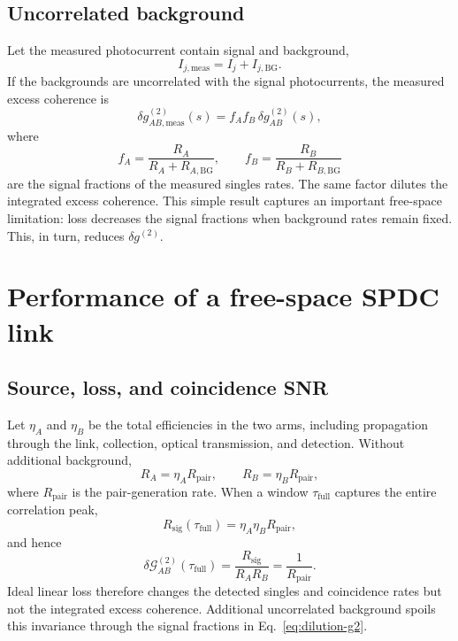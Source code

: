 \documentclass[a4paper,10pt]{article}
\begin{document}
\subsection{Uncorrelated background}

Let the measured photocurrent contain signal and background,
\begin{equation}
    I_{j,\mathrm{meas}}=I_j+I_{j,\mathrm{BG}}.
\end{equation}
If the backgrounds are uncorrelated with the signal photocurrents, the measured excess coherence is
\begin{equation}
    \label{eq:dilution-g2}
    \delta g^{(2)}_{AB,\mathrm{meas}}(s)
    =f_A f_B\,\delta g^{(2)}_{AB}(s),
\end{equation}
where
\begin{equation}
    f_A=\frac{R_A}{R_A+R_{A,\mathrm{BG}}},
    \qquad
    f_B=\frac{R_B}{R_B+R_{B,\mathrm{BG}}}
\end{equation}
are the signal fractions of the measured singles rates.  The same factor dilutes the integrated excess coherence.  This simple result captures an important free-space limitation: loss decreases the signal fractions when background rates remain fixed. This, in turn, reduces $\delta g^{(2)}$.

\section{Performance of a free-space SPDC link}
\label{sec:spdc}

\subsection{Source, loss, and coincidence SNR}

Let $\eta_A$ and $\eta_B$ be the total efficiencies in the two arms, including propagation through the link, collection, optical transmission, and detection.  Without additional background,
\begin{equation}
    \label{eq:spdc-singles-rates}
    R_A=\eta_A R_{\mathrm{pair}},
    \qquad
    R_B=\eta_B R_{\mathrm{pair}},
\end{equation}
where $R_{\mathrm{pair}}$ is the pair-generation rate.  When a window $\tau_{\mathrm{full}}$ captures the entire correlation peak,
\begin{equation}
    \label{eq:spdc-signal-rate}
    R_{\mathrm{sig}}(\tau_{\mathrm{full}})
    =\eta_A\eta_B R_{\mathrm{pair}},
\end{equation}
and hence
\begin{equation}
    \label{eq:G-loss-invariance}
    \delta\mathcal{G}^{(2)}_{AB}(\tau_{\mathrm{full}})
    =\frac{R_{\mathrm{sig}}}{R_A R_B}
    =\frac{1}{R_{\mathrm{pair}}}.
\end{equation}
Ideal linear loss therefore changes the detected singles and coincidence rates but not the integrated excess coherence.  Additional uncorrelated background spoils this invariance through the signal fractions in Eq.~\eqref{eq:dilution-g2}.
\end{document}
